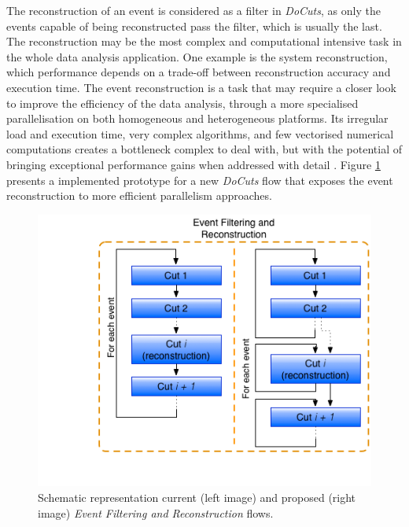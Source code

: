 The reconstruction of an event is considered as a filter in \textit{DoCuts}, as only the events capable of being reconstructed pass the filter, which is usually the last. The reconstruction may be the most complex and computational intensive task in the whole data analysis application. One example is the \ttH system reconstruction, which performance depends on a trade-off between reconstruction accuracy and execution time. The event reconstruction is a task that may require a closer look to improve the efficiency of the data analysis, through a more specialised parallelisation on both homogeneous and heterogeneous platforms. Its irregular load and execution time, very complex algorithms, and few vectorised numerical computations creates a bottleneck complex to deal with, but with the potential of bringing exceptional performance gains when addressed with detail \cite{paperAMP}. Figure \ref{fig:new_docuts} presents a implemented prototype for a new \textit{DoCuts} flow that exposes the event reconstruction to more efficient parallelism approaches.

\begin{figure}[!htp]
	\begin{center}
		\includegraphics[scale=0.5]{imgs/new_docuts.png}
		\caption{Schematic representation current (left image) and proposed (right image) \textit{Event Filtering and Reconstruction} flows.}
		\label{fig:new_docuts}
	\end{center}
\end{figure}


